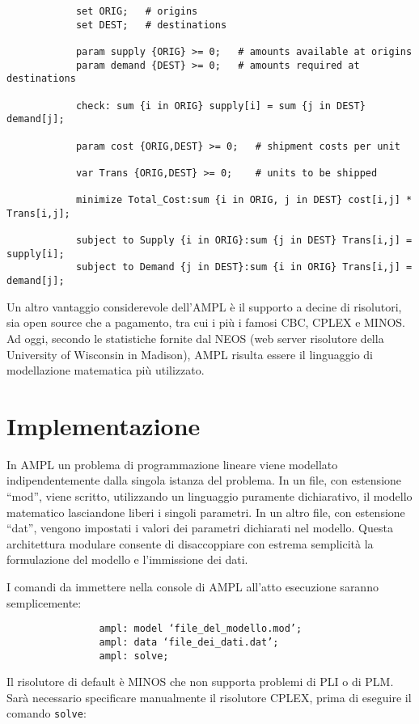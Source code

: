 		\begin{verbatim}
			set ORIG;   # origins
			set DEST;   # destinations

			param supply {ORIG} >= 0;   # amounts available at origins
			param demand {DEST} >= 0;   # amounts required at destinations

			check: sum {i in ORIG} supply[i] = sum {j in DEST} demand[j];

			param cost {ORIG,DEST} >= 0;   # shipment costs per unit

			var Trans {ORIG,DEST} >= 0;    # units to be shipped

			minimize Total_Cost:sum {i in ORIG, j in DEST} cost[i,j] * Trans[i,j];

			subject to Supply {i in ORIG}:sum {j in DEST} Trans[i,j] = supply[i];
			subject to Demand {j in DEST}:sum {i in ORIG} Trans[i,j] = demand[j];
		\end{verbatim}

		Un altro vantaggio considerevole dell’AMPL è il supporto a decine di risolutori, sia open source che a pagamento, tra cui i più i famosi CBC, CPLEX e MINOS.
		Ad oggi, secondo le statistiche fornite dal NEOS (web server risolutore della University of Wisconsin in Madison), AMPL risulta essere il linguaggio di modellazione matematica più utilizzato.

		\section{Implementazione} %
		\label{sec:implementazione}
			In AMPL un problema di programmazione lineare viene modellato indipendentemente dalla singola istanza del problema. In un file, con estensione “mod”, viene scritto, utilizzando un linguaggio puramente dichiarativo, il modello matematico lasciandone liberi i singoli parametri. In un altro file, con estensione “dat”, vengono impostati i valori dei parametri dichiarati nel modello.
			Questa architettura modulare consente di disaccoppiare con estrema semplicità la formulazione del modello e l’immissione dei dati.

			I comandi da immettere nella console di AMPL all’atto esecuzione saranno semplicemente:	
			\begin{verbatim}
				ampl: model ‘file_del_modello.mod’;
				ampl: data ‘file_dei_dati.dat’;
				ampl: solve;
			\end{verbatim}

			Il risolutore di default è MINOS che non supporta problemi di PLI o di PLM. Sarà necessario specificare manualmente il risolutore CPLEX, prima di eseguire il comando \texttt{solve}:

